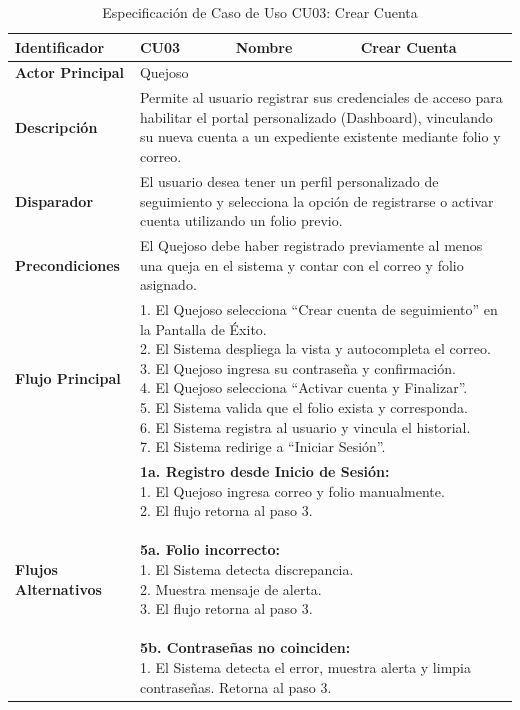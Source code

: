 \vspace{0.8cm}

\begingroup
\setlength{\parskip}{0pt}
\begin{longtable}{|p{3.5cm}|p{2cm}|p{2.5cm}|p{7cm}|}
\caption{Especificación de Caso de Uso CU03: Crear Cuenta}
\label{tab:cu03_crear_cuenta} \\
\hline
\textbf{Identificador} & CU03 & \textbf{Nombre} & Crear Cuenta \\ \hline
\textbf{Actor Principal} & \multicolumn{3}{p{11.5cm}|}{Quejoso} \\ \hline
\textbf{Descripción} & \multicolumn{3}{p{11.5cm}|}{Permite al usuario registrar sus credenciales de acceso para habilitar el portal personalizado (Dashboard), vinculando su nueva cuenta a un expediente existente mediante folio y correo.} \\ \hline
\textbf{Disparador} & \multicolumn{3}{p{11.5cm}|}{El usuario desea tener un perfil personalizado de seguimiento y selecciona la opción de registrarse o activar cuenta utilizando un folio previo.} \\ \hline
\textbf{Precondiciones} & \multicolumn{3}{p{11.5cm}|}{El Quejoso debe haber registrado previamente al menos una queja en el sistema y contar con el correo y folio asignado.} \\ \hline
\textbf{Flujo Principal} & \multicolumn{3}{p{11.5cm}|}{1. El Quejoso selecciona ``Crear cuenta de seguimiento'' en la Pantalla de Éxito.\newline 2. El Sistema despliega la vista y autocompleta el correo.\newline 3. El Quejoso ingresa su contraseña y confirmación.\newline 4. El Quejoso selecciona ``Activar cuenta y Finalizar''.\newline 5. El Sistema valida que el folio exista y corresponda.\newline 6. El Sistema registra al usuario y vincula el historial.\newline 7. El Sistema redirige a ``Iniciar Sesión''.} \\ \hline
\textbf{Flujos Alternativos} & \multicolumn{3}{p{11.5cm}|}{\textbf{1a. Registro desde Inicio de Sesión:}\newline 1. El Quejoso ingresa correo y folio manualmente.\newline 2. El flujo retorna al paso 3.\newline\newline \textbf{5a. Folio incorrecto:}\newline 1. El Sistema detecta discrepancia.\newline 2. Muestra mensaje de alerta.\newline 3. El flujo retorna al paso 3.\newline\newline \textbf{5b. Contraseñas no coinciden:}\newline 1. El Sistema detecta el error, muestra alerta y limpia contraseñas. Retorna al paso 3.} \\ \hline

\end{longtable}
